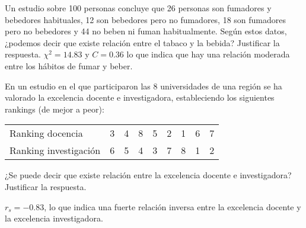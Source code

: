 {Un estudio sobre 100 personas concluye que 26 personas son fumadores y bebedores habituales, 12 son bebedores pero no
fumadores, 18 son fumadores pero no bebedores y 44 no beben ni fuman habitualmente. Según estos datos, ¿podemos decir
que existe relación entre el tabaco y la bebida? Justificar la respuesta. 
}
{$\chi^2=14.83$ y $C=0.36$ lo que indica que hay una relación moderada entre los hábitos de fumar y beber.}
{}


{En un estudio en el que participaron las 8 universidades de una región se ha valorado la excelencia docente e
investigadora, estableciendo los siguientes rankings (de mejor a peor):
\begin{center}
\begin{tabular}{lcccccccc}
Ranking docencia & 3 & 4 & 8 & 5 & 2 & 1 & 6 & 7\\
Ranking investigación & 6 & 5 & 4 & 3 & 7 & 8 & 1 & 2\\
\end{tabular}
\end{center}
¿Se puede decir que existe relación entre la excelencia docente e investigadora? Justificar la respuesta.
}
{$r_s=-0.83$, lo que indica una fuerte relación inversa entre la excelencia docente y la excelencia investigadora.}
{}


